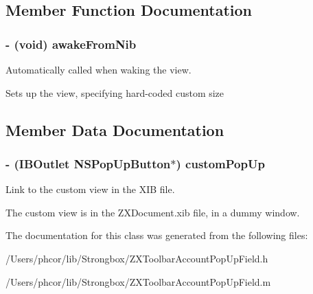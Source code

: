 \subsection{Member Function Documentation}
\hypertarget{interface_z_x_toolbar_account_pop_up_field_1e30ad7a1502bd0693ddb54423c0516b}{
\subsubsection[{awakeFromNib}]{\setlength{\rightskip}{0pt plus 5cm}- (void) awakeFromNib }}
\label{interface_z_x_toolbar_account_pop_up_field_1e30ad7a1502bd0693ddb54423c0516b}


Automatically called when waking the view. 

Sets up the view, specifying hard-coded custom size 

\subsection{Member Data Documentation}
\hypertarget{interface_z_x_toolbar_account_pop_up_field_0cf6a25bc50454e899ab37ff77340753}{
\subsubsection[{customPopUp}]{\setlength{\rightskip}{0pt plus 5cm}- (IBOutlet NSPopUpButton$\ast$) {\bf customPopUp}}}
\label{interface_z_x_toolbar_account_pop_up_field_0cf6a25bc50454e899ab37ff77340753}


Link to the custom view in the XIB file. 

The custom view is in the ZXDocument.xib file, in a dummy window. 

The documentation for this class was generated from the following files:\begin{CompactItemize}
\item 
/Users/phcor/lib/Strongbox/ZXToolbarAccountPopUpField.h\item 
/Users/phcor/lib/Strongbox/ZXToolbarAccountPopUpField.m\end{CompactItemize}
